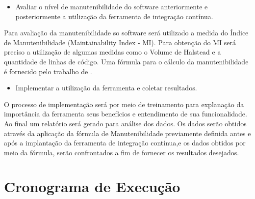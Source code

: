 \begin{itemize}
\item Avaliar o nível de manutenibilidade do software anteriormente e posteriormente a utilização da ferramenta de integração contínua.
\end{itemize}
Para avaliação da manutenibilidade so software será utilizado a medida do Índice de Manutenibilidade (Maintainability Index - MI). Para obtenção do MI será preciso a utilização de algumas medidas como o Volume de Halstead e a quantidade de linhas de código. Uma fórmula para o cálculo da manutenibilidade é fornecido pelo trabalho de .
\begin{itemize}

\item Implementar a utilização da ferramenta e coletar resultados.
\end{itemize}
O processo de implementação será por meio de treinamento para explanação da importância da ferramenta seus benefícios e entendimento de sua funcionalidade. Ao final um relatório será gerado para análise dos dados. Os dados serão obtidos através da aplicação da fórmula de Manutenibilidade previamente definida antes e após a implantação da ferramenta de integração contínua,e os dados obtidos por meio da fórmula, serão confrontados a fim de fornecer os resultados desejados.


\pagebreak
\section{Cronograma de Execução}

